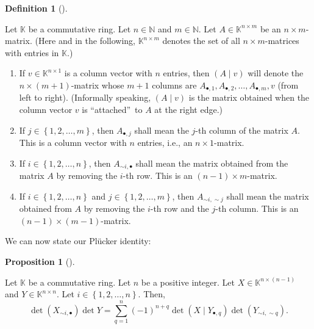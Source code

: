 \documentclass[numbers=enddot,12pt,final,onecolumn,notitlepage]{scrartcl}%
\theoremstyle{definition}
\newtheorem{prop}[theo]{Proposition}
\newenvironment{proposition}[1][]
{\begin{prop}[#1]\begin{leftbar}}
{\end{leftbar}\end{prop}}
\newtheorem{defi}[theo]{Definition}
\newenvironment{definition}[1][]
{\begin{defi}[#1]\begin{leftbar}}
{\end{leftbar}\end{defi}}
\let\sumnonlimits\sum
\renewcommand{\sum}{\sumnonlimits\limits}
\theoremstyle{plainsl}
\begin{document}
\begin{definition}
\label{def.addcol-uncol}Let $\mathbb{K}$ be a commutative ring. Let
$n\in\mathbb{N}$ and $m\in\mathbb{N}$. Let $A\in\mathbb{K}^{n\times m}$ be an
$n\times m$-matrix. (Here and in the following, $\mathbb{K}^{n\times m}$
denotes the set of all $n\times m$-matrices with entries in $\mathbb{K}$.)

\begin{enumerate}
\item[\textbf{(a)}] If $v\in\mathbb{K}^{n\times1}$ is a column vector with $n$
entries, then $\left(  A\mid v\right)  $ will denote the $n\times\left(
m+1\right)  $-matrix whose $m+1$ columns are $A_{\bullet,1},A_{\bullet
,2},\ldots,A_{\bullet,m},v$ (from left to right). (Informally speaking,
$\left(  A\mid v\right)  $ is the matrix obtained when the column vector $v$
is \textquotedblleft attached\textquotedblright\ to $A$ at the right edge.)

\item[\textbf{(b)}] If $j\in\left\{  1,2,\ldots,m\right\}  $, then
$A_{\bullet,j}$ shall mean the $j$-th column of the matrix $A$. This is a
column vector with $n$ entries, i.e., an $n\times1$-matrix.

\item[\textbf{(c)}] If $i\in\left\{  1,2,\ldots,n\right\}  $, then $A_{\sim
i,\bullet}$ shall mean the matrix obtained from the matrix $A$ by removing the
$i$-th row. This is an $\left(  n-1\right)  \times m$-matrix.

\item[\textbf{(d)}] If $i\in\left\{  1,2,\ldots,n\right\}  $ and $j\in\left\{
1,2,\ldots,m\right\}  $, then $A_{\sim i,\sim j}$ shall mean the matrix
obtained from $A$ by removing the $i$-th row and the $j$-th column. This is an
$\left(  n-1\right)  \times\left(  m-1\right)  $-matrix.
\end{enumerate}
\end{definition}

We can now state our Pl\"{u}cker identity:

\begin{proposition}
\label{prop.desnanot.XY}Let $\mathbb{K}$ be a commutative ring. Let $n$ be a
positive integer. Let $X\in\mathbb{K}^{n\times\left(  n-1\right)  }$ and
$Y\in\mathbb{K}^{n\times n}$. Let $i\in\left\{  1,2,\ldots,n\right\}  $. Then,%
\[
\det\left(  X_{\sim i,\bullet}\right)  \det Y=\sum_{q=1}^{n}\left(  -1\right)
^{n+q}\det\left(  X\mid Y_{\bullet,q}\right)  \det\left(  Y_{\sim i,\sim
q}\right)  .
\]

\end{proposition}
\end{document}
